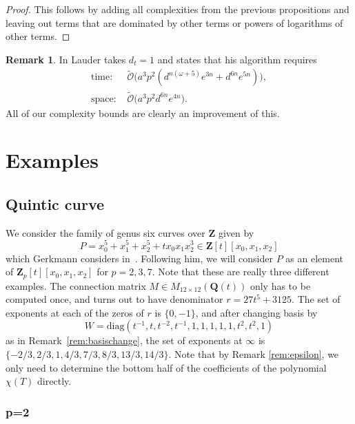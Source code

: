 \documentclass[a4paper,11pt]{article}
\numberwithin{equation}{section}
\newcommand{\ZZ}{\mathbf{Z}} %
\newcommand{\QQ}{\mathbf{Q}} %
\providecommand{\SoftOh}{\tilde{\mathcal{O}}} %
\theoremstyle{definition}
\newtheorem{rem}[thm]{Remark}
\begin{document}
\begin{proof}
This follows by adding all complexities from the previous propositions and 
leaving out terms that are dominated by other terms or powers of
logarithms of other terms.
\end{proof}

\begin{rem} In \citep{Lauder2004a} Lauder takes $d_t=1$ and states that his
algorithm requires
\begin{align*}
\mbox{time: }  &\SoftOh\bigl(a^3 p^2 (d^{n(\omega+5)} e^{3n} + d^{6n} e^{5n}) \bigr), \\ 
\mbox{space: } &\SoftOh\bigl(a^3 p^2 d^{6n} e^{4n} \bigr).
\end{align*}
All of our complexity bounds are clearly an improvement of this.
\end{rem}


\section{Examples}
\label{sec:Examples}

\subsection{Quintic curve}

We consider the family of genus six curves over $\ZZ$ given by 
\begin{equation*}
P=x_0^5 + x_1^5 + x_2^5 + t x_0 x_1 x_2^3 \in \ZZ[t][x_0,x_1,x_2]
\end{equation*}
which Gerkmann considers in~\citep[\S 7.4]{Gerkmann2007}. Following him, 
we will consider $P$ as an element of $\ZZ_p[t][x_0,x_1,x_2]$ for 
$p=2,3,7$. Note that these are really three different examples.
The connection matrix $M \in M_{12 \times 12}(\QQ(t))$ only has to 
be computed once, and turns out to have denominator $r=27t^5+3125$. 
The set of exponents at each of the zeros of $r$ is $\{0,-1\}$, and 
after changing basis by
\[ 
W=\mbox{diag}(t^{-1},t,t^{-2},t^{-1},1,1,1,1,1,t^2,t^2,1)
\] 
as in 
Remark~\ref{rem:basischange}, 
the set of exponents  at $\infty$ is $\{-2/3,2/3,1,4/3,7/3,8/3,13/3,14/3\}$. 
Note that by
Remark \ref{rem:epsilon}, we only need to determine the bottom 
half of the coefficients of the polynomial $\chi(T)$ directly.

\subsubsection{p=2}
\end{document}
